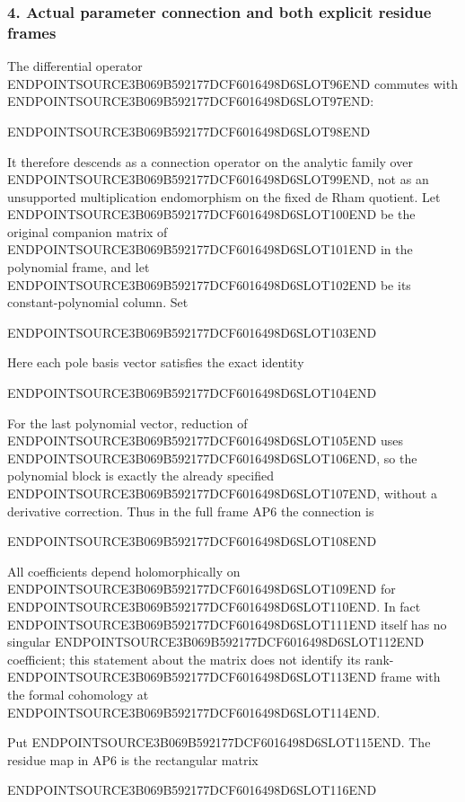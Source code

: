 \subsubsection{4. Actual parameter connection and both explicit residue frames}\label{endpoint-analytic_pole--actual-parameter-connection-and-both-explicit-residue-frames}

The differential operator ENDPOINTSOURCE3B069B592177DCF6016498D6SLOT96END commutes with ENDPOINTSOURCE3B069B592177DCF6016498D6SLOT97END:

ENDPOINTSOURCE3B069B592177DCF6016498D6SLOT98END

It therefore descends as a connection operator on the analytic family over ENDPOINTSOURCE3B069B592177DCF6016498D6SLOT99END, not as an unsupported multiplication endomorphism on the fixed de Rham quotient. Let ENDPOINTSOURCE3B069B592177DCF6016498D6SLOT100END be the original companion matrix of ENDPOINTSOURCE3B069B592177DCF6016498D6SLOT101END in the polynomial frame, and let ENDPOINTSOURCE3B069B592177DCF6016498D6SLOT102END be its constant-polynomial column. Set

ENDPOINTSOURCE3B069B592177DCF6016498D6SLOT103END

Here each pole basis vector satisfies the exact identity

ENDPOINTSOURCE3B069B592177DCF6016498D6SLOT104END

For the last polynomial vector, reduction of ENDPOINTSOURCE3B069B592177DCF6016498D6SLOT105END uses ENDPOINTSOURCE3B069B592177DCF6016498D6SLOT106END, so the polynomial block is exactly the already specified ENDPOINTSOURCE3B069B592177DCF6016498D6SLOT107END, without a derivative correction. Thus in the full frame AP6 the connection is

ENDPOINTSOURCE3B069B592177DCF6016498D6SLOT108END

All coefficients depend holomorphically on ENDPOINTSOURCE3B069B592177DCF6016498D6SLOT109END for ENDPOINTSOURCE3B069B592177DCF6016498D6SLOT110END. In fact ENDPOINTSOURCE3B069B592177DCF6016498D6SLOT111END itself has no singular ENDPOINTSOURCE3B069B592177DCF6016498D6SLOT112END coefficient; this statement about the matrix does not identify its rank-ENDPOINTSOURCE3B069B592177DCF6016498D6SLOT113END frame with the formal cohomology at ENDPOINTSOURCE3B069B592177DCF6016498D6SLOT114END.

Put ENDPOINTSOURCE3B069B592177DCF6016498D6SLOT115END. The residue map in AP6 is the rectangular matrix

ENDPOINTSOURCE3B069B592177DCF6016498D6SLOT116END

